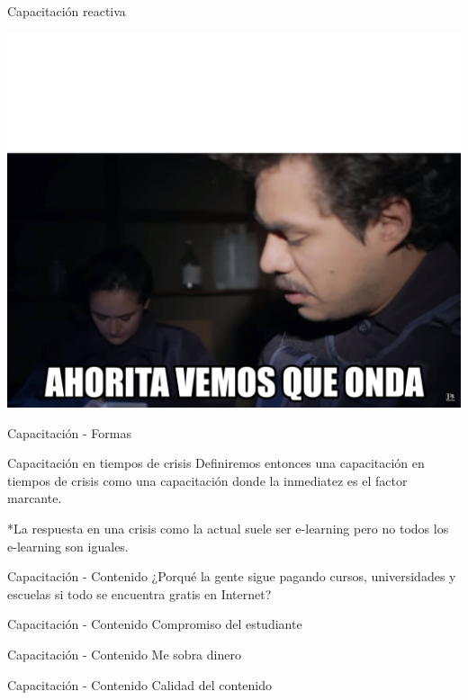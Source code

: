 \documentclass[aspectratio=169]{beamer}
\begin{document}
\begin{frame}[fragile]{Capacitación reactiva}
    \begin{center}
        \includegraphics[width=0.6\linewidth]{Images/onda}
    \end{center}	
\end{frame}


\begin{frame}[fragile]{Capacitación - Formas}
   \begin{exampleblock}{Capacitación en tiempos de crisis}
    Definiremos entonces una capacitación en tiempos de crisis como una capacitación donde la inmediatez es el factor marcante.
   \end{exampleblock}

*La respuesta en una crisis como la actual suele ser e-learning pero no todos los e-learning son iguales.
\end{frame}

\begin{frame}[fragile]{Capacitación - Contenido}
\LARGE ¿Porqué la gente sigue pagando cursos, universidades y escuelas si todo se encuentra gratis en Internet?
\end{frame}

\begin{frame}[fragile]{Capacitación - Contenido}
    \LARGE Compromiso del estudiante
\end{frame}


\begin{frame}[fragile]{Capacitación - Contenido}
    \LARGE Me sobra dinero
\end{frame}

\begin{frame}[fragile]{Capacitación - Contenido}
    \LARGE Calidad del contenido
\end{frame}
\end{document}
